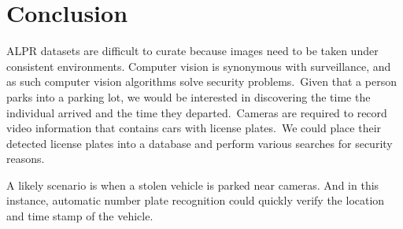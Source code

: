 \documentclass[a4paper,twoside,10pt]{report}
\begin{document}
\section{Conclusion}
ALPR datasets are difficult to curate because images need to be taken under consistent environments.
Computer vision is synonymous with surveillance, and as such computer vision algorithms solve security problems.\ 
Given that a person parks into a parking lot, we would be interested in discovering the time the individual arrived and the time they departed.\
Cameras are required to record video information that contains cars with license plates.\ 
We could place their detected license plates into a database and perform various searches for security reasons.\ 

A likely scenario is when a stolen vehicle is parked near cameras. And in this instance, automatic number plate recognition could quickly verify the location and time stamp of the vehicle.

\nocite{*}

\end{document}
